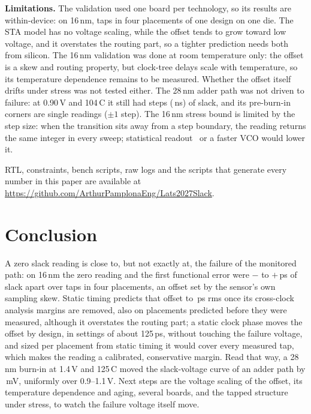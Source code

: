 \documentclass[conference]{IEEEtran}
\newif\ifblind \blindfalse
\begin{document}
\textbf{Limitations.} The validation used one board per technology, so its results are
within-device: on 16\,nm, \vAllN{} taps in four placements of one design on one die. The STA
model has no voltage scaling, while the offset tends to grow toward low voltage, and it overstates the
routing part, so a tighter prediction needs both from silicon. The 16\,nm validation was done at
room temperature only: the offset is a skew and routing
property, but clock-tree delays scale with temperature, so its temperature dependence remains to be
measured. Whether the offset itself drifts under stress was not tested either. The 28\,nm adder path
was not driven to failure: at 0.90\,V and 104\,\textdegree C it still had \vPostLo{} steps
(\vPostNsLo\,ns) of slack, and its pre-burn-in corners are single readings ($\pm1$ step). The 16\,nm
stress bound is limited by the step size: when the transition sits away from a step boundary, the
reading returns the same integer in every sweep; statistical readout~\cite{wong09} or a faster VCO
would lower it.
\ifblind
RTL, constraints, bench scripts, raw logs and the scripts that generate every number in this paper
will be made public upon acceptance.
\else
RTL, constraints, bench scripts, raw logs and the scripts that generate every number in this paper
are available at \url{https://github.com/ArthurPamplonaEng/Lats2027Slack}.
\fi

\section{Conclusion}

A zero slack reading is close to, but not exactly at, the failure of the monitored path: on 16\,nm
the zero reading and the first functional error were $-$\vAllMinPsAbs{} to $+$\vAllMaxPsAbs\,ps of
slack apart over \vAllN{} taps in four placements, an offset set by the sensor's own sampling skew.
Static timing predicts that offset to \vAllRms\,ps rms once its cross-clock analysis margins are
removed, also on placements predicted before they were measured, although it overstates the
routing part; a static clock phase moves the offset by design, in settings of about 125\,ps,
without touching the failure voltage, and sized per placement from static timing it would cover
every measured tap, which makes the reading a calibrated, conservative margin. Read that way, a 28\,nm burn-in at 1.4\,V and 125\,\textdegree C moved the
slack-voltage curve of an adder path by \vShiftmV\,mV, uniformly over 0.9--1.1\,V. Next steps are the
voltage scaling of the offset, its temperature dependence and aging, several boards, and the tapped
structure under stress, to watch the failure voltage itself move.



\end{document}
